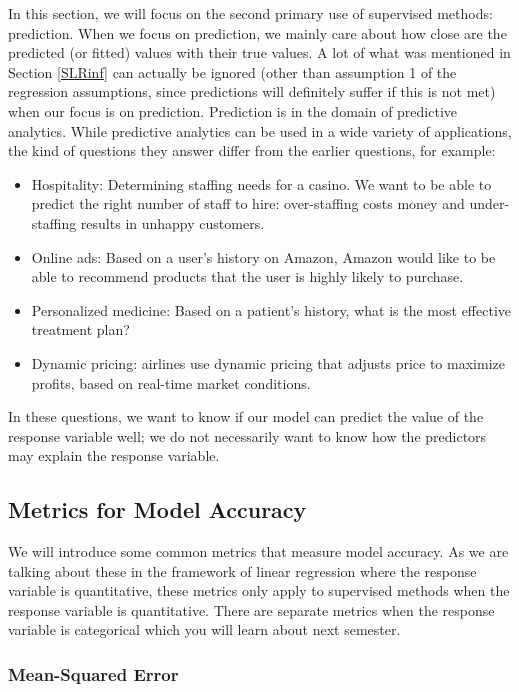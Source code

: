 \documentclass[
]{book}
\providecommand{\tightlist}{%
  \setlength{\itemsep}{0pt}\setlength{\parskip}{0pt}}
\begin{document}
In this section, we will focus on the second primary use of supervised methods: prediction. When we focus on prediction, we mainly care about how close are the predicted (or fitted) values with their true values. A lot of what was mentioned in Section \ref{SLRinf} can actually be ignored (other than assumption 1 of the regression assumptions, since predictions will definitely suffer if this is not met) when our focus is on prediction. Prediction is in the domain of predictive analytics. While predictive analytics can be used in a wide variety of applications, the kind of questions they answer differ from the earlier questions, for example:

\begin{itemize}
\tightlist
\item
  Hospitality: Determining staffing needs for a casino. We want to be able to predict the right number of staff to hire: over-staffing costs money and under-staffing results in unhappy customers.
\item
  Online ads: Based on a user's history on Amazon, Amazon would like to be able to recommend products that the user is highly likely to purchase.
\item
  Personalized medicine: Based on a patient's history, what is the most effective treatment plan?
\item
  Dynamic pricing: airlines use dynamic pricing that adjusts price to maximize profits, based on real-time market conditions.
\end{itemize}

In these questions, we want to know if our model can predict the value of the response variable well; we do not necessarily want to know how the predictors may explain the response variable.

\hypertarget{metrics-for-model-accuracy}{%
\subsection{Metrics for Model Accuracy}\label{metrics-for-model-accuracy}}

We will introduce some common metrics that measure model accuracy. As we are talking about these in the framework of linear regression where the response variable is quantitative, these metrics only apply to supervised methods when the response variable is quantitative. There are separate metrics when the response variable is categorical which you will learn about next semester.

\hypertarget{mean-squared-error}{%
\subsubsection{Mean-Squared Error}\label{mean-squared-error}}
\end{document}

